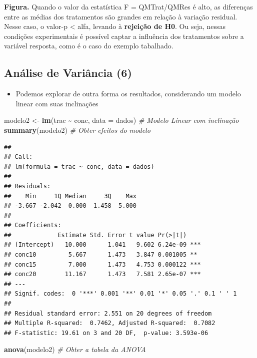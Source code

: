 \documentclass[
]{book}
\newenvironment{Shaded}{\begin{snugshade}}{\end{snugshade}}
\newcommand{\AttributeTok}[1]{\textcolor[rgb]{0.13,0.29,0.53}{#1}}
\newcommand{\CommentTok}[1]{\textcolor[rgb]{0.56,0.35,0.01}{\textit{#1}}}
\newcommand{\FunctionTok}[1]{\textcolor[rgb]{0.13,0.29,0.53}{\textbf{#1}}}
\newcommand{\NormalTok}[1]{#1}
\newcommand{\OtherTok}[1]{\textcolor[rgb]{0.56,0.35,0.01}{#1}}
\newcommand{\SpecialCharTok}[1]{\textcolor[rgb]{0.81,0.36,0.00}{\textbf{#1}}}
\providecommand{\tightlist}{%
  \setlength{\itemsep}{0pt}\setlength{\parskip}{0pt}}
\begin{document}
\textbf{Figura.} Quando o valor da estatística F = QMTrat/QMRes é alto, as diferenças entre as médias dos tratamentos são grandes em relação à variação residual. Nesse caso, o valor-p \textless{} alfa, levando à \textbf{rejeição de H0}. Ou seja, nessas condições experimentais é possível captar a influência dos tratamentos sobre a variável resposta, como é o caso do exemplo tabalhado.

\subsection{Análise de Variância (6)}\label{anuxe1lise-de-variuxe2ncia-6}

\begin{itemize}
\tightlist
\item
  Podemos explorar de outra forma os resultados, considerando um modelo linear com suas inclinações
\end{itemize}

\begin{Shaded}
\begin{Highlighting}[]
\NormalTok{modelo2 }\OtherTok{\textless{}{-}} \FunctionTok{lm}\NormalTok{(trac }\SpecialCharTok{\textasciitilde{}}\NormalTok{ conc, }\AttributeTok{data =}\NormalTok{ dados) }\CommentTok{\# Modelo Linear com inclinação}
\FunctionTok{summary}\NormalTok{(modelo2) }\CommentTok{\# Obter efeitos do modelo}
\end{Highlighting}
\end{Shaded}

\begin{verbatim}
## 
## Call:
## lm(formula = trac ~ conc, data = dados)
## 
## Residuals:
##    Min     1Q Median     3Q    Max 
## -3.667 -2.042  0.000  1.458  5.000 
## 
## Coefficients:
##             Estimate Std. Error t value Pr(>|t|)    
## (Intercept)   10.000      1.041   9.602 6.24e-09 ***
## conc10         5.667      1.473   3.847 0.001005 ** 
## conc15         7.000      1.473   4.753 0.000122 ***
## conc20        11.167      1.473   7.581 2.65e-07 ***
## ---
## Signif. codes:  0 '***' 0.001 '**' 0.01 '*' 0.05 '.' 0.1 ' ' 1
## 
## Residual standard error: 2.551 on 20 degrees of freedom
## Multiple R-squared:  0.7462, Adjusted R-squared:  0.7082 
## F-statistic: 19.61 on 3 and 20 DF,  p-value: 3.593e-06
\end{verbatim}

\begin{Shaded}
\begin{Highlighting}[]
\FunctionTok{anova}\NormalTok{(modelo2) }\CommentTok{\# Obter a tabela da ANOVA}
\end{Highlighting}
\end{Shaded}
\end{document}
